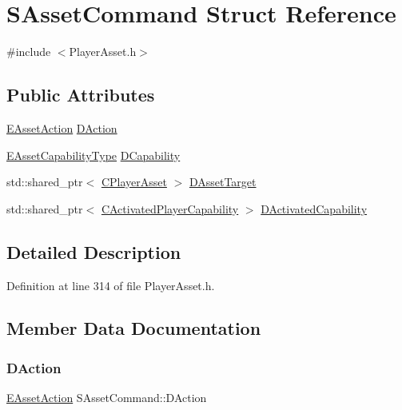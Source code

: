\hypertarget{structSAssetCommand}{}\section{S\+Asset\+Command Struct Reference}
\label{structSAssetCommand}


{\ttfamily \#include $<$Player\+Asset.\+h$>$}

\subsection*{Public Attributes}
\begin{DoxyCompactItemize}
\item 
\hyperlink{GameDataTypes_8h_ab47668e651a3032cfb9c40ea2d60d670}{E\+Asset\+Action} \hyperlink{structSAssetCommand_a8edd3b3d59a76d5514ba403bc8076a75}{D\+Action}
\item 
\hyperlink{GameDataTypes_8h_a35b98ce26aca678b03c6f9f76e4778ce}{E\+Asset\+Capability\+Type} \hyperlink{structSAssetCommand_a734ea7c6847457b437360f333f570ff9}{D\+Capability}
\item 
std\+::shared\+\_\+ptr$<$ \hyperlink{classCPlayerAsset}{C\+Player\+Asset} $>$ \hyperlink{structSAssetCommand_a3d9b43f6e59c386c48c41a65448a0c39}{D\+Asset\+Target}
\item 
std\+::shared\+\_\+ptr$<$ \hyperlink{classCActivatedPlayerCapability}{C\+Activated\+Player\+Capability} $>$ \hyperlink{structSAssetCommand_ad8beda19520811cc70fe1eab16c774dd}{D\+Activated\+Capability}
\end{DoxyCompactItemize}


\subsection{Detailed Description}


Definition at line 314 of file Player\+Asset.\+h.



\subsection{Member Data Documentation}
\hypertarget{structSAssetCommand_a8edd3b3d59a76d5514ba403bc8076a75}{}\label{structSAssetCommand_a8edd3b3d59a76d5514ba403bc8076a75} 
\subsubsection{\texorpdfstring{D\+Action}{DAction}}
{\footnotesize\ttfamily \hyperlink{GameDataTypes_8h_ab47668e651a3032cfb9c40ea2d60d670}{E\+Asset\+Action} S\+Asset\+Command\+::\+D\+Action}



